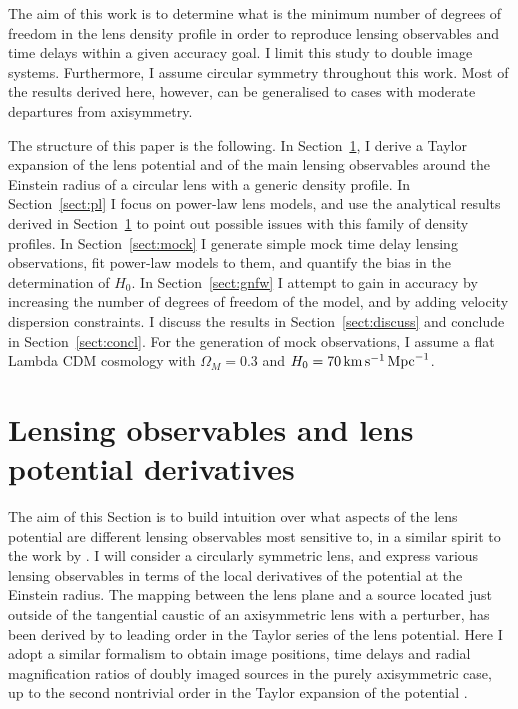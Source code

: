 \documentclass[usenatbib]{mnras}
\def\Sref#1{Section~\ref{#1}\xspace}
\begin{document}
The aim of this work is to determine what is the minimum number of degrees of freedom in the lens density profile in order to reproduce lensing observables and time delays within a given accuracy goal.
I limit this study to double image systems. Furthermore, I assume circular symmetry throughout this work. Most of the results derived here, however, can be generalised to cases with moderate departures from axisymmetry.

The structure of this paper is the following. In \Sref{sect:pot}, I derive a Taylor expansion of the lens potential and of the main lensing observables around the Einstein radius of a circular lens with a generic density profile.
In \Sref{sect:pl} I focus on power-law lens models, and use the analytical results derived in \Sref{sect:pot} to point out possible issues with this family of density profiles.
In \Sref{sect:mock} I generate simple mock time delay lensing observations, fit power-law models to them, and quantify the bias in the determination of $H_0$.
In \Sref{sect:gnfw} I attempt to gain in accuracy by increasing the number of degrees of freedom of the model, and by adding velocity dispersion constraints.
I discuss the results in \Sref{sect:discuss} and conclude in \Sref{sect:concl}.
For the generation of mock observations, I assume a flat Lambda CDM cosmology with $\Omega_M = 0.3$ and $H_0 = 70\,\rm{km}\,{s}^{-1}\,\rm{Mpc}^{-1}$.

\section{Lensing observables and lens potential derivatives}\label{sect:pot}

The aim of this Section is to build intuition over what aspects of the lens potential are different lensing observables most sensitive to, in a similar spirit to the work by \citet{Koc02}.
I will consider a circularly symmetric lens, and express various lensing observables in terms of the local derivatives of the potential at the Einstein radius.
The mapping between the lens plane and a source located just outside of the tangential caustic of an axisymmetric lens with a perturber, has been derived by \citet{Wag17b} to leading order in the Taylor series of the lens potential.
Here I adopt a similar formalism to obtain image positions, time delays and radial magnification ratios of doubly imaged sources in the purely axisymmetric case, up to the second nontrivial order in the Taylor expansion of the potential \citep[see also][for a similar study in the case of merging triplets and pairs of images]{W+B16, Wag17}.
%
\end{document}
